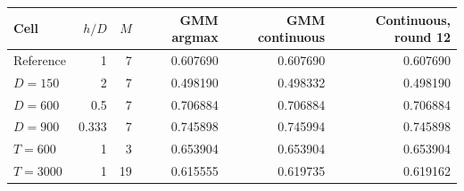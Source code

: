 \begin{tabular}{lrrrrr}
\toprule
Cell & $h/D$ & $M$ & GMM argmax & GMM continuous & Continuous, round 12 \\
\midrule
Reference & 1 & 7 & 0.607690 & 0.607690 & 0.607690 \\
$D=150$ & 2 & 7 & 0.498190 & 0.498332 & 0.498190 \\
$D=600$ & 0.5 & 7 & 0.706884 & 0.706884 & 0.706884 \\
$D=900$ & 0.333 & 7 & 0.745898 & 0.745994 & 0.745898 \\
$T=600$ & 1 & 3 & 0.653904 & 0.653904 & 0.653904 \\
$T=3000$ & 1 & 19 & 0.615555 & 0.619735 & 0.619162 \\
\bottomrule
\end{tabular}
